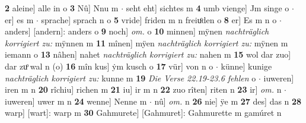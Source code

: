 \documentclass[8pt,a4paper,notitlepage]{article}
\begin{document}
\begin{table}[ht]
\begin{minipage}[t]{0.5\linewidth}
\textbf{2} aleine] alle in o \textbf{3} Nû] Nnu m  $\cdot$ seht eht] sichtes m \textbf{4} umb vienge] Jm singe o  $\cdot$ er] es m  $\cdot$ sprache] sprach n o \textbf{5} vride] friden m n freiuͦden o \textbf{8} er] Es m n o  $\cdot$ anders] [andern]: anders o \textbf{9} noch] \textit{om.} o \textbf{10} minnen] mÿnen \textit{nachträglich korrigiert zu:} mÿnnen m \textbf{11} mînen] mÿen \textit{nachträglich korrigiert zu:} mÿnen m iemann o \textbf{13} nâhen] nahet \textit{nachträglich korrigiert zu:} nahen m \textbf{15} wol dar zuo] dar zuͦ wal n (o) \textbf{16} mîn kus] ẏm kusch o \textbf{17} vür] von n o  $\cdot$ künne] kunige \textit{nachträglich korrigiert zu:} kunne m \textbf{19} \textit{Die Verse 22.19-23.6 fehlen} o   $\cdot$ iuweren] iren m n \textbf{20} rîchiu] richen m \textbf{21} iu] ir m n \textbf{22} zuo rîten] riten n \textbf{23} ir] \textit{om.} n  $\cdot$ iuweren] uwer m n \textbf{24} wenne] Nenne m  $\cdot$ nû] \textit{om.} n \textbf{26} nie] ÿe m \textbf{27} des] das n \textbf{28} warp] [wart]: warp m \textbf{30} Gahmurete] [Gahmuret]: Gahmurette m gamúret n \newline
\end{minipage}
\end{table}
\newpage
\end{document}
